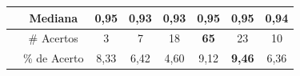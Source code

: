 \begin{quadro}[h]
\begin{tabular}{c|c|c|c|c|c|c|c|}
\multicolumn{1}{|c|}{}                                                                                   & Mediana      & \textbf{0,95}                                       & 0,93                                                 & 0,93                                                   & \textbf{0,95}                                           & \textbf{0,95} & 0,94      \\ \hline
\multicolumn{1}{l|}{}                                                                                    & \# Acertos   & 3                                                   & 7                                                    & 18                                                     & \textbf{65}                                             & 23            & 10        \\ \cline{2-8} 
\multicolumn{1}{l|}{}                                                                                    & \% de Acerto & 8,33                                                & 6,42                                                 & 4,60                                                   & 9,12                                                    & \textbf{9,46} & 6,36      \\ \cline{2-8} 
\end{tabular}
\end{quadro}

